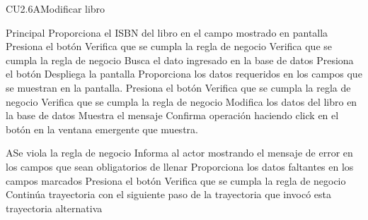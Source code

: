 \begin{UseCase}{CU2.6A}{Modificar libro}
{\begin{itemize}
			\end{itemize}			
		}
\end{UseCase}


\begin{UCtrayectoria}{Principal}
		\UCpaso[\UCactor] Proporciona el ISBN del libro en el campo mostrado en pantalla 
		\UCpaso[\UCactor] Presiona el botón  
		\UCpaso[\UCsist] Verifica que se cumpla la regla de negocio  
		\UCpaso[\UCsist] Verifica que se cumpla la regla de negocio  
		\UCpaso[\UCsist] Busca el dato ingresado en la base de datos  
		\UCpaso[\UCactor] Presiona el botón  
		\UCpaso[\UCsist] Despliega la pantalla 
		\UCpaso[\UCactor] Proporciona los datos requeridos en los campos que se muestran en la pantalla. 
		\UCpaso[\UCactor] Presiona el botón 
		\UCpaso[\UCsist] Verifica que se cumpla la regla de negocio  
		\UCpaso[\UCsist] Verifica que se cumpla la regla de negocio  
		\UCpaso[\UCsist] Modifica los datos del libro en la base de datos
		\UCpaso[\UCsist] Muestra el mensaje 
		\UCpaso[\UCactor] Confirma operación haciendo click en el botón  en la ventana emergente que muestra.
\end{UCtrayectoria}



\begin{UCtrayectoriaA}{A}{Se viola la regla de negocio }	
			\UCpaso[\UCsist] Informa al actor mostrando el mensaje de error  en los campos que sean obligatorios de llenar
			\UCpaso[\UCactor] Proporciona los datos faltantes en los campos marcados 
			\UCpaso[\UCactor] Presiona el botón  
			\UCpaso[\UCactor] Verifica que se cumpla la regla de negocio  
			\UCpaso[\UCsist] Continúa trayectoria con el siguiente paso de la trayectoria que invocó esta trayectoria alternativa
\end{UCtrayectoriaA}

